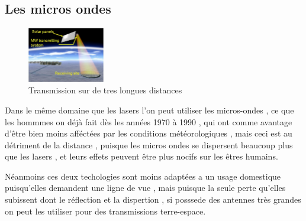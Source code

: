 \documentclass[12pt]{report}
\begin{document}
    \subsection{Les micros ondes}
\begin{figure}
  \begin{center}
    \includegraphics[width=0.3\textwidth]{microwave}
  \end{center}
  \caption{Transmission sur de tres longues distances}
\end{figure}Dans le même domaine que les lasers l'on peut utiliser les micros-ondes , ce que les hommmes on déjà fait dès les années 1970 à 1990 , qui ont comme avantage d'être bien moins afféctées par les conditions météorologiques , mais ceci est au détriment de la distance , puisque les micros ondes se dispersent beaucoup plus que les lasers , et leurs effets peuvent être plus nocifs sur les êtres humains.

  Néanmoins ces deux techologies sont moins adaptées a un usage domestique puisqu'elles demandent une ligne de vue , mais puisque la seule perte qu'elles subissent dont le réflection et la dispertion , si posssede des antennes très grandes on peut les utiliser pour des transmissions terre-espace.
\end{document}
